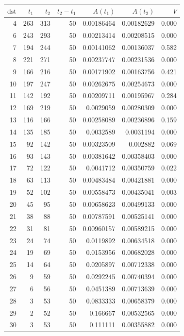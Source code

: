 \begin{tabular}{r r r r r r r}
\toprule
$\mathrm{dst}$ & $t_1$ & $t_2$ & $t_2-t_1$ & $A(t_1)$ & $A(t_2)$ & $V$ \\
\midrule
4 & 263 & 313 & 50 & 0.00186464 & 0.00182629 & 0.000 \\
6 & 243 & 293 & 50 & 0.00213414 & 0.00208515 & 0.000 \\
7 & 194 & 244 & 50 & 0.00141062 & 0.00136037 & 0.582 \\
8 & 221 & 271 & 50 & 0.00237747 & 0.00231536 & 0.000 \\
9 & 166 & 216 & 50 & 0.00171902 & 0.00163756 & 0.421 \\
10 & 197 & 247 & 50 & 0.00262675 & 0.00254673 & 0.000 \\
11 & 142 & 192 & 50 & 0.00209711 & 0.00195967 & 0.284 \\
12 & 169 & 219 & 50 & 0.0029059 & 0.00280309 & 0.000 \\
13 & 116 & 166 & 50 & 0.00258089 & 0.00236896 & 0.159 \\
14 & 135 & 185 & 50 & 0.0032589 & 0.0031194 & 0.000 \\
15 & 92 & 142 & 50 & 0.00323509 & 0.002882 & 0.069 \\
16 & 93 & 143 & 50 & 0.00381642 & 0.00358403 & 0.000 \\
17 & 72 & 122 & 50 & 0.0041712 & 0.00350759 & 0.022 \\
18 & 63 & 113 & 50 & 0.00483484 & 0.00421881 & 0.000 \\
19 & 52 & 102 & 50 & 0.00558473 & 0.00435041 & 0.003 \\
20 & 45 & 95 & 50 & 0.00658623 & 0.00499133 & 0.000 \\
21 & 38 & 88 & 50 & 0.00787591 & 0.00525141 & 0.000 \\
22 & 31 & 81 & 50 & 0.00960157 & 0.00589215 & 0.000 \\
23 & 24 & 74 & 50 & 0.0119892 & 0.00634518 & 0.000 \\
24 & 19 & 69 & 50 & 0.0153956 & 0.00682028 & 0.000 \\
25 & 14 & 64 & 50 & 0.0205897 & 0.00712338 & 0.000 \\
26 & 9 & 59 & 50 & 0.0292245 & 0.00740394 & 0.000 \\
27 & 6 & 56 & 50 & 0.0451389 & 0.00713639 & 0.000 \\
28 & 3 & 53 & 50 & 0.0833333 & 0.00658379 & 0.000 \\
29 & 2 & 52 & 50 & 0.166667 & 0.00532565 & 0.000 \\
30 & 3 & 53 & 50 & 0.111111 & 0.00355882 & 0.000 \\

\end{tabular}
